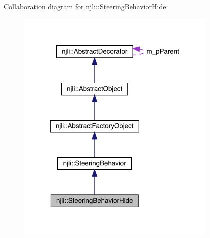 Collaboration diagram for njli\+:\+:Steering\+Behavior\+Hide\+:\nopagebreak
\begin{figure}[H]
\begin{center}
\leavevmode
\includegraphics[width=273pt]{classnjli_1_1_steering_behavior_hide__coll__graph}
\end{center}
\end{figure}

